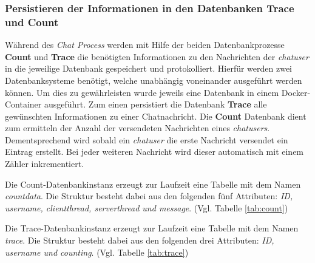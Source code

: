 \documentclass[10pt,journal,compsoc]{IEEEtran}
\begin{document}
\subsubsection{Persistieren der Informationen in den Datenbanken Trace und Count}
Während des \textit{Chat Process} werden mit Hilfe der beiden Datenbankprozesse \textbf{Count} und \textbf{Trace} die benötigten Informationen zu den Nachrichten der \textit{chatuser} in die jeweilige Datenbank gespeichert und protokolliert. Hierfür werden zwei Datenbanksysteme benötigt, welche unabhängig voneinander ausgeführt werden können. Um dies zu gewährleisten wurde jeweils eine Datenbank in einem Docker-Container ausgeführt. Zum einen persistiert die Datenbank \textbf{Trace} alle gewünschten Informationen zu einer Chatnachricht. Die \textbf{Count} Datenbank dient zum ermitteln der Anzahl der versendeten Nachrichten eines \textit{chatusers}. Dementsprechend wird sobald ein \textit{chatuser} die erste Nachricht versendet ein Eintrag erstellt. Bei jeder weiteren Nachricht wird dieser automatisch mit einem Zähler inkrementiert. 

Die Count-Datenbankinstanz erzeugt zur Laufzeit eine Tabelle mit dem Namen \textit{countdata}. Die Struktur besteht dabei aus den folgenden fünf Attributen: \textit{ID, username, clientthread, serverthread und message}. (Vgl. Tabelle \ref{tab:count})

Die Trace-Datenbankinstanz erzeugt zur Laufzeit eine Tabelle mit dem Namen \textit{trace}. Die Struktur besteht dabei aus den folgenden drei Attributen: \textit{ID, username und counting}. (Vgl. Tabelle \ref{tab:trace})
\end{document}
